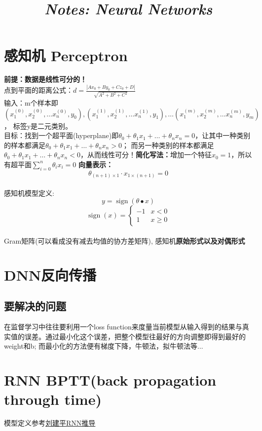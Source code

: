 \documentclass[UTF8]{article}
\title{
    \begin{center}{\Huge \textit{Notes: Neural Networks}}
    \end{center}}
\begin{document}
    \maketitle
    \tableofcontents

    \newpage


    \section{感知机 Perceptron}
    \textbf{前提：数据是线性可分的！}\\
    点到平面的距离公式：$d=\frac{\left|A x_{0}+B y_{0}+C z_{0}+D\right|}{\sqrt{A^{2}+B^{2}+C^{2}}}$
    \\
    输入：m个样本即$\left(x_{1}^{(0)}, x_{2}^{(0)}, \ldots x_{n}^{(0)}, y_{0}\right),\left(x_{1}^{(1)}, x_{2}^{(1)}, \ldots x_{n}^{(1)}, y_{1}\right), \ldots\left(x_{1}^{(m)}, x_{2}^{(m)}, \ldots x_{n}^{(m)}, y_{m}\right)$，
    标签y是二元类别。
    \\
    目标：找到一个超平面(hyperplane)即$\theta_{0}+\theta_{1} x_{1}+\ldots+\theta_{n} x_{n}=0$，让其中一种类别的样本都满足$\theta_{0}+\theta_{1} x_{1}+\ldots+\theta_{n} x_{n}>0$；
    而另一种类别的样本都满足$\theta_{0}+\theta_{1} x_{1}+\ldots+\theta_{n} x_{n}<0$，从而线性可分！\textbf{简化写法：}增加一个特征$x_0=1$，所以有超平面$\sum_{i=0}^{n} \theta_{i} x_{i}=0$
    \textbf{向量表示：}$$\theta_{(n+1) \times 1} \cdot x_{1 \times (n+1)}= 0$$
    \\
    感知机模型定义: $$y=\operatorname{sign}(\theta \bullet x)$$
    $$\operatorname{sign}(x)=\left\{\begin{array}{ll}{-1} & {x<0} \\ {1} & {x \geq 0}\end{array}\right.$$
    \\
    Gram矩阵(可以看成没有减去均值的协方差矩阵), 感知机\textbf{原始形式以及对偶形式}

    \section{DNN反向传播}
    \subsection{要解决的问题}
    在监督学习中往往要利用一个loss function来度量当前模型从输入得到的结果与真实值的误差。通过最小化这个误差，把整个模型往最好的方向调整即得到最好的weight和b;
    而最小化的方法便有梯度下降，牛顿法，拟牛顿法等...

    \section{RNN BPTT(back propagation through time)}
    模型定义参考\href{https://www.cnblogs.com/pinard/p/6509630.html}{刘建平RNN推导}
\end{document}
